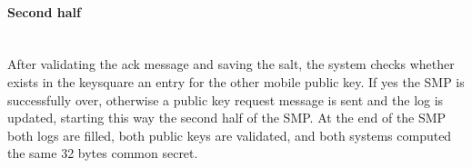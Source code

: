 \paragraph{Second half} \hspace{0pt} \\
After validating the ack message and saving the salt, the  system checks whether exists in the keysquare an entry for the other mobile public key. If yes the SMP is successfully over, otherwise a public key request message is sent and the log is updated, starting this way the second half of the SMP.
At the end of the SMP both logs are filled, both public keys are validated, and both systems computed the same 32 bytes common secret.